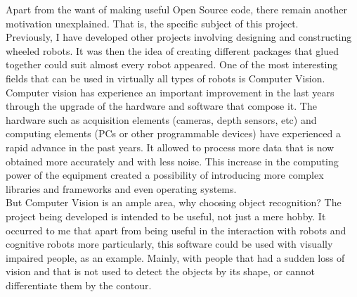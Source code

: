 Apart from the want of making useful Open Source code, there remain another motivation unexplained. That is, the specific subject of this project. 
\\

Previously, I have developed other projects involving designing and constructing wheeled robots. It was then the idea of creating different packages that glued together could suit almost every robot appeared. One of the most interesting fields that can be used in virtually all types of robots is Computer Vision. 
\\

Computer vision has experience an important improvement in the last years through the upgrade of the hardware and software that compose it. The hardware such as acquisition elements (cameras, depth sensors, etc) and computing elements (PCs or other programmable devices) have experienced a rapid advance in the past years. It allowed to process more data that is now obtained more accurately and with less noise. This increase in the computing power of the equipment created a possibility of introducing more complex libraries and frameworks and even operating systems. 
\\

But Computer Vision is an ample area, why choosing object recognition? The project being developed is intended to be useful, not just a mere hobby. It occurred to me that apart from being useful in the interaction with robots and cognitive robots more particularly, this software could be used with visually impaired people, as an example. Mainly, with people that had a sudden loss of vision and that is not used to detect the objects by its shape, or cannot differentiate them by the contour. 

